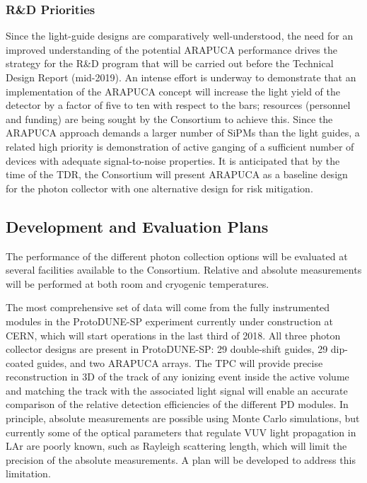 \subsubsection{R\&D Priorities} 
Since the light-guide designs are comparatively well-understood, the need for an improved understanding of the potential ARAPUCA performance drives the strategy for the R\&D program that will be carried out before the Technical Design Report (mid-2019). 
An intense effort is underway to demonstrate that an implementation of the ARAPUCA concept will increase the light yield of the detector by a factor of five to ten with respect to the bars; resources (personnel and funding)  are being sought by the Consortium to achieve this.  Since the ARAPUCA approach demands a larger number of SiPMs than the light guides, a related high priority is demonstration of active ganging of a sufficient number of devices with adequate signal-to-noise properties.
It is anticipated that by the time of the TDR, the Consortium will present ARAPUCA as a baseline design for the photon collector with one alternative design for risk mitigation.  


\subsection{Development and Evaluation Plans}

The performance of the different photon collection options will be evaluated at several facilities available to the Consortium. 
Relative and absolute measurements will be performed at both room and cryogenic temperatures.

The most comprehensive set of data will come from the fully instrumented modules in the ProtoDUNE-SP experiment currently 
under construction at CERN, which will start operations in the last third of \num{2018}.
All  three photon collector designs are present in ProtoDUNE-SP: \num{29} 
double-shift guides, \num{29} dip-coated guides, and two ARAPUCA arrays. 
The TPC will provide precise reconstruction in 3D of the track of any ionizing event inside the active volume and matching  
the track with the associated light signal will enable an accurate comparison of the relative detection efficiencies of the different PD modules. 
In principle, absolute measurements are possible using Monte Carlo simulations, but currently some of the optical parameters that 
regulate VUV light propagation in LAr are poorly known, such as Rayleigh 
scattering length, which will limit the precision of the absolute  measurements. 
A plan will be developed to address this limitation.

